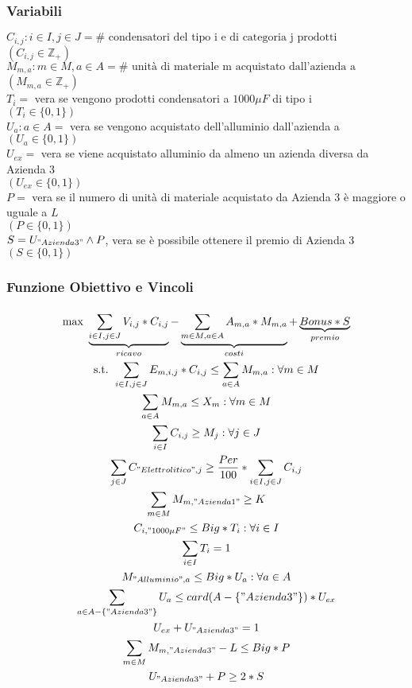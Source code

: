 \documentclass[11pt,a4paper]{article}
\begin{document}
\subsubsection{Variabili}
$C_{i,j}:i \in I, j \in J =\# \text{ condensatori del tipo i e di categoria j prodotti}$ \\
$(C_{i,j} \in \mathbb{Z}_+)$ \\
$M_{m,a}:m \in M, a \in A =\# \text{ unità di materiale m acquistato dall'azienda a}$ \\
$(M_{m,a} \in \mathbb{Z}_+)$ \\
$T_{i} =$ vera se vengono prodotti condensatori a $1000 \mu F$ di tipo i \\
$(T_{i} \in \{ 0,1\} )$ \\
$U_{a}:a \in A =$ vera se vengono acquistato dell'alluminio dall'azienda a \\
$(U_{a} \in \{ 0,1\} )$ \\
$U_{ex} =$ vera se viene acquistato alluminio da almeno un azienda diversa da Azienda 3 \\
$(U_{ex} \in \{ 0,1\} )$ \\
$P =$ vera se il numero di unità di materiale acquistato da Azienda 3 è maggiore o uguale a $L$ \\
$(P \in \{ 0,1\} )$ \\
$S =U_{"Azienda 3"} \land P$, vera se è possibile ottenere il premio di Azienda 3 \\
$(S \in \{ 0,1\} )$

\subsubsection{Funzione Obiettivo e Vincoli}
\begin{gather*}
\text{max } \underbrace{\sum_{i \in I,j \in J}^{} V_{i,j}*C_{i,j}}_{ricavo} - \underbrace{\sum_{m \in M,a \in A} A_{m,a}*M_{m,a}}_{costi} + \underbrace{Bonus*S}_{premio} \\
\text{s.t. } \sum_{i \in I,j \in J} E_{m,i,j}*C_{i,j} \leq \sum_{a \in A} M_{m,a} :\forall m \in M \\
\sum_{a \in A} M_{m,a} \leq X_{m} :\forall m \in M \\
\sum_{i \in I} C_{i,j} \geq M_{j} :\forall j \in J \\
\sum_{j \in J} C_{"Elettrolitico",j} \geq \frac{Per}{100}*\sum_{i \in I,j \in J} C_{i,j} \\
\sum_{m \in M} M_{m,"Azienda 1"} \geq K \\
C_{i,"1000 \mu F"} \leq Big*T_{i} :\forall i \in I \\
\sum_{i \in I} T_{i} = 1 \\
M_{"Alluminio",a} \leq Big*U_{a} :\forall a \in A \\
\sum_{a \in A-\{"Azienda 3"\}} U_{a} \leq card(A-\{"Azienda 3"\})*U_{ex} \\
U_{ex} + U_{"Azienda 3"} = 1 \\
\sum_{m \in M} M_{m,"Azienda 3"} -L\leq Big*P \\
U_{"Azienda 3"} + P \geq 2*S
\end{gather*}
\end{document}
